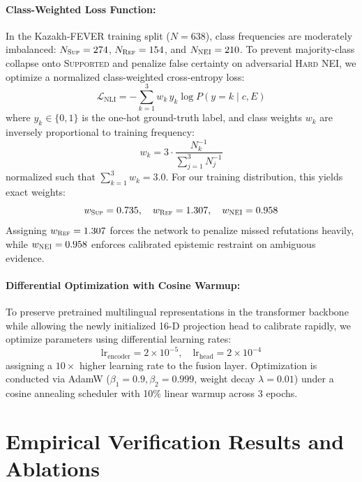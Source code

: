 \paragraph{Class-Weighted Loss Function:}
In the Kazakh-FEVER training split ($N=638$), class frequencies are moderately imbalanced: $N_{\textsc{Sup}} = 274$, $N_{\textsc{Ref}} = 154$, and $N_{\textsc{NEI}} = 210$. To prevent majority-class collapse onto \textsc{Supported} and penalize false certainty on adversarial \textsc{Hard NEI}, we optimize a normalized class-weighted cross-entropy loss:
\begin{equation}
    \label{eq:class_weighted_loss}
    \mathcal{L}_{\text{NLI}} = - \sum_{k=1}^3 w_k \, y_k \log P(y = k \mid c, E)
\end{equation}
where $y_k \in \{0, 1\}$ is the one-hot ground-truth label, and class weights $w_k$ are inversely proportional to training frequency:
\begin{equation}
    w_k = 3 \cdot \frac{N_k^{-1}}{\sum_{j=1}^3 N_j^{-1}}
\end{equation}
normalized such that $\sum_{k=1}^3 w_k = 3.0$. For our training distribution, this yields exact weights:
\begin{equation}
    \label{eq:exact_class_weights}
    w_{\textsc{Sup}} = 0.735, \quad w_{\textsc{Ref}} = 1.307, \quad w_{\textsc{NEI}} = 0.958
\end{equation}
Assigning $w_{\textsc{Ref}} = 1.307$ forces the network to penalize missed refutations heavily, while $w_{\textsc{NEI}} = 0.958$ enforces calibrated epistemic restraint on ambiguous evidence.

\paragraph{Differential Optimization with Cosine Warmup:}
To preserve pretrained multilingual representations in the transformer backbone while allowing the newly initialized 16-D projection head to calibrate rapidly, we optimize parameters using differential learning rates:
\begin{equation}
    \text{lr}_{\text{encoder}} = 2 \times 10^{-5}, \quad \text{lr}_{\text{head}} = 2 \times 10^{-4}
\end{equation}
assigning a $10\times$ higher learning rate to the fusion layer. Optimization is conducted via AdamW ($\beta_1 = 0.9, \beta_2 = 0.999$, weight decay $\lambda = 0.01$) under a cosine annealing scheduler with 10\% linear warmup across 3 epochs.

\section{Empirical Verification Results and Ablations}
\label{sec:empirical_verification_results}

